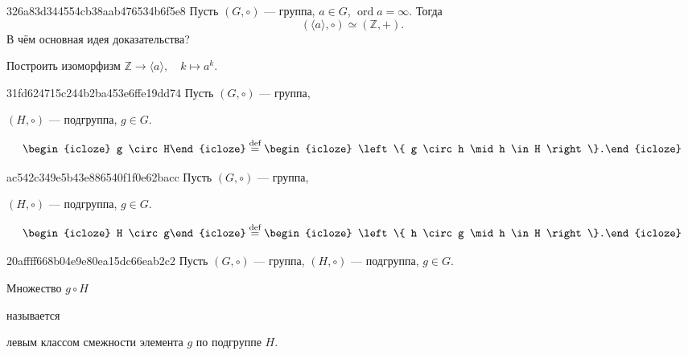 \begin{note}{326a83d344554cb38aab476534b6f5e8}
    Пусть \({ (G, \circ)}\) --- группа, \({ a \in G }\), \({ \operatorname{ord} a = \infty }\).
    Тогда
    \[
        (\langle a \rangle, \circ) \simeq (\mathbb Z, +).
    \]
    В чём основная идея доказательства?

    \begin{cloze}{1}
        Построить изоморфизм \({ \mathbb Z \to \langle a \rangle, \quad k \mapsto a^{k} }\).
    \end{cloze}
\end{note}

\begin{note}{31fd624715c244b2ba453e6ffe19dd74}
    Пусть \({ (G, \circ) }\) --- группа, \begin{icloze}{3}\({ (H, \circ) }\) --- подгруппа,\: \({ g \in G }\).\end{icloze}
    \[
        \begin{icloze}{2}g \circ H\end{icloze} \overset{\text{def}}= \begin{icloze}{1}\left\{ g \circ h \mid h \in H \right\}.\end{icloze}
    \]
\end{note}

\begin{note}{ac542c349e5b43e886540f1f0e62bacc}
    Пусть \({ (G, \circ) }\) --- группа, \begin{icloze}{3}\({ (H, \circ) }\) --- подгруппа,\: \({ g \in G }\).\end{icloze}
    \[
        \begin{icloze}{2}H \circ g\end{icloze} \overset{\text{def}}= \begin{icloze}{1}\left\{ h \circ g \mid h \in H \right\}.\end{icloze}
    \]
\end{note}

\begin{note}{20affff668b04e9e80ea15dc66eab2c2}
    Пусть \({ (G, \circ) }\) --- группа, \({ (H, \circ) }\) --- подгруппа,\: \({ g \in G }\).
    \begin{icloze}{2}Множество \({ g \circ H }\)\end{icloze} называется \begin{icloze}{1}левым классом смежности элемента \({ g }\) по подгруппе \({ H }\).\end{icloze}
\end{note}

